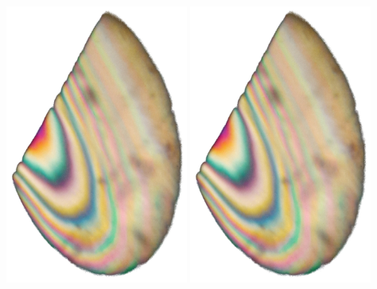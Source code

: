 \includegraphics[width=0.45\textwidth]{Spannungsoptik.jpg}
\includegraphics[width=0.45\textwidth]{Spannungsoptik.jpg}


%	
%	



